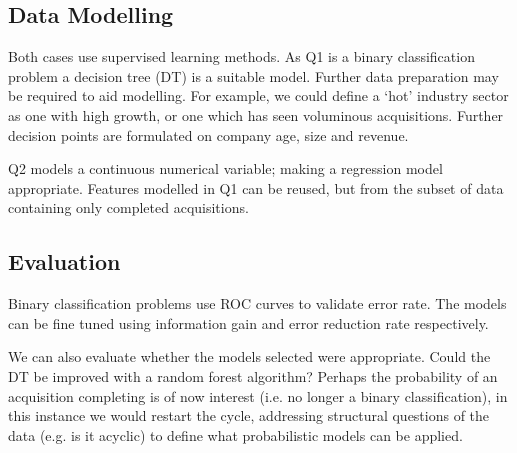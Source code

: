 \documentclass[12pt]{article}
\begin{document}
 \subsection{Data Modelling}
Both cases use supervised learning methods. As Q1 is a binary classification problem a decision tree (DT) is a suitable model. Further data preparation may be required to aid modelling. For example, we could define a `hot' industry sector as one with high growth, or one which has seen voluminous acquisitions. Further decision points are formulated on company age, size and revenue.

 Q2 models a continuous numerical variable; making a regression model appropriate. Features modelled in Q1 can be reused, but from the subset of data containing only completed acquisitions.

 \subsection{Evaluation}
Binary classification problems use ROC curves to validate error rate. The models can be fine tuned using information gain and error reduction rate respectively.

We can also evaluate whether the models selected were appropriate. Could the DT be improved with a random forest algorithm? Perhaps the probability of an acquisition completing is of now interest (i.e. no longer a binary classification), in this instance we would restart the cycle, addressing structural questions of the data (e.g. is it acyclic) to define what probabilistic models can be applied.
\end{document}
